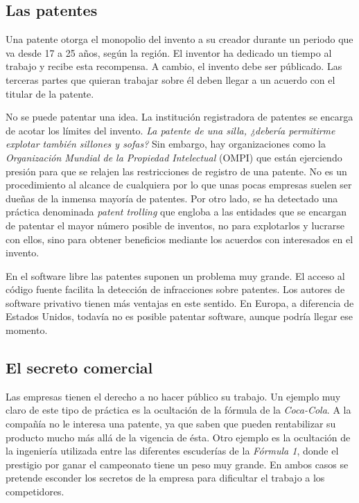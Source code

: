 \subsection{Las patentes}
Una patente otorga el monopolio del invento a su creador durante un
periodo que va desde 17 a 25 años, según la región. El inventor ha
dedicado un tiempo al trabajo y recibe esta recompensa. A cambio, el
invento debe ser públicado. Las terceras partes que quieran trabajar
sobre él deben llegar a un acuerdo con el titular de la patente.

No se puede patentar una idea. La institución registradora de patentes
se encarga de acotar los límites del invento. \emph{La patente de una
  silla, ¿debería permitirme explotar también sillones y sofas?} Sin
embargo, hay organizaciones como la \emph{Organización Mundial de la
  Propiedad Intelectual} (OMPI) que están ejerciendo presión para que
se relajen las restricciones de registro de una patente. No es un
procedimiento al alcance de cualquiera por lo que unas pocas empresas
suelen ser dueñas de la inmensa mayoría de patentes. Por otro lado, se
ha detectado una práctica denominada \emph{patent trolling} que
engloba a las entidades que se encargan de patentar el mayor número
posible de inventos, no para explotarlos y lucrarse con ellos, sino
para obtener beneficios mediante los acuerdos con interesados en el
invento.

En el software libre las patentes suponen un problema muy grande. El
acceso al código fuente facilita la detección de infracciones sobre
patentes. Los autores de software privativo tienen más ventajas en
este sentido. En Europa, a diferencia de Estados Unidos, todavía no es
posible patentar software, aunque podría llegar ese momento.

\subsection{El secreto comercial}
Las empresas tienen el derecho a no hacer público su trabajo. Un
ejemplo muy claro de este tipo de práctica es la ocultación de la
fórmula de la \emph{Coca-Cola}. A la compañía no le interesa una
patente, ya que saben que pueden rentabilizar su producto mucho más
allá de la vigencia de ésta. Otro ejemplo es la ocultación de la
ingeniería utilizada entre las diferentes escuderías de la
\emph{Fórmula 1}, donde el prestigio por ganar el campeonato tiene un
peso muy grande. En ambos casos se pretende esconder los secretos de
la empresa para dificultar el trabajo a los competidores.


